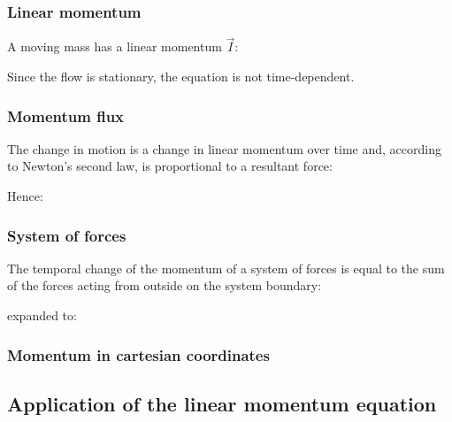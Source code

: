 \documentclass{article}
\begin{document}
\subsubsection{Linear momentum}
A moving mass has a linear momentum $\vec{I}$:

Since the flow is stationary, the equation is not time-dependent.

\subsubsection{Momentum flux}
The change in motion is a change in linear momentum over time and, according to Newton's
second law, is proportional to a resultant force:

Hence:

\newpage
\subsubsection{System of forces}
The temporal change of the momentum of a system of forces is equal to the sum of the
forces acting from outside on the system boundary:

expanded to:

\subsubsection{Momentum in cartesian coordinates}

\subsection{Application of the linear momentum equation}
\end{document}
